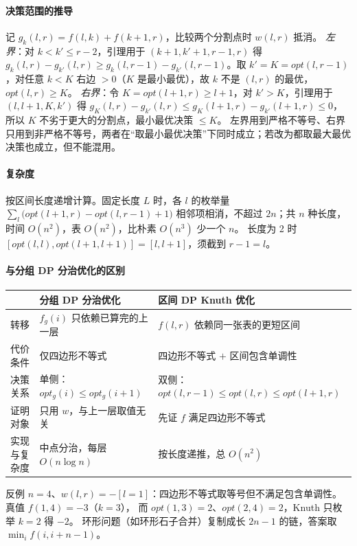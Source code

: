 \paragraph{决策范围的推导} 记 $g_k(l,r)=f(l,k)+f(k+1,r)$，比较两个分割点时 $w(l,r)$ 抵消。
\textit{左界}：对 $k<k'\le r-2$，引理用于 $(k+1,k'+1,r-1,r)$ 得
$g_k(l,r)-g_{k'}(l,r)\ge g_k(l,r-1)-g_{k'}(l,r-1)$。取 $k'=K=opt(l,r-1)$，对任意 $k<K$ 右边 $>0$（$K$ 是最小最优），故 $k$ 不是 $(l,r)$ 的最优，$opt(l,r)\ge K$。
\textit{右界}：令 $K=opt(l+1,r)\ge l+1$，对 $k'>K$，引理用于 $(l,l+1,K,k')$ 得
$g_K(l,r)-g_{k'}(l,r)\le g_K(l+1,r)-g_{k'}(l+1,r)\le0$，所以 $K$ 不劣于更大的分割点，最小最优决策 $\le K$。
左界用到严格不等号、右界只用到非严格不等号，两者在“取最小最优决策”下同时成立；若改为都取最大最优决策也成立，但不能混用。

\paragraph{复杂度} 按区间长度递增计算。固定长度 $L$ 时，各 $l$ 的枚举量
$\sum_l\bigl(opt(l+1,r)-opt(l,r-1)+1\bigr)$ 相邻项相消，不超过 $2n$；共 $n$ 种长度，时间 $O(n^2)$，表 $O(n^2)$，比朴素 $O(n^3)$ 少一个 $n$。
长度为 2 时 $[opt(l,l),opt(l+1,l+1)]=[l,l+1]$，须截到 $r-1=l$。

\paragraph{与分组 DP 分治优化的区别}
\begin{center}\small
\begin{tabular}{@{}lll@{}}
\toprule
& 分组 DP 分治优化 & 区间 DP Knuth 优化\\
\midrule
转移 & $f_g(i)$ 只依赖已算完的上一层 & $f(l,r)$ 依赖同一张表的更短区间\\
代价条件 & 仅四边形不等式 & 四边形不等式 $+$ 区间包含单调性\\
决策关系 & 单侧：$opt_g(i)\le opt_g(i+1)$ & 双侧：$opt(l,r-1)\le opt(l,r)\le opt(l+1,r)$\\
证明对象 & 只用 $w$，与上一层取值无关 & 先证 $f$ 满足四边形不等式\\
实现与复杂度 & 中点分治，每层 $O(n\log n)$ & 按长度递推，总 $O(n^2)$\\
\bottomrule
\end{tabular}
\end{center}
反例 $n=4$、$w(l,r)=-[l=1]$：四边形不等式取等号但不满足包含单调性。真值 $f(1,4)=-3$（$k=3$），
而 $opt(1,3)=2$、$opt(2,4)=2$，Knuth 只枚举 $k=2$ 得 $-2$。
环形问题（如环形石子合并）复制成长 $2n-1$ 的链，答案取 $\min_i f(i,i+n-1)$。


